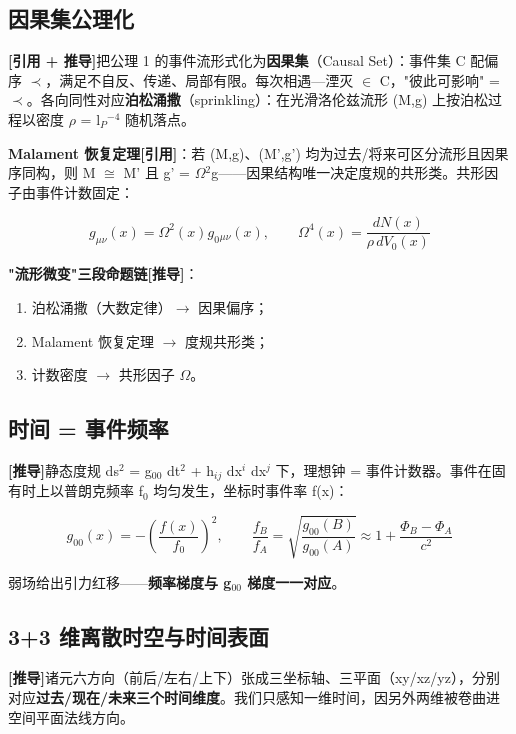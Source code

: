 \documentclass[UTF8,fontset=windows]{csoarticle}
\newcommand{\mtag}[1]{\textbf{[#1]}}
\newcommand{\up}[1]{\ensuremath{^{#1}}}
\newcommand{\down}[1]{\ensuremath{_{#1}}}
\begin{document}
\subsection{因果集公理化}

\mtag{引用 + 推导}把公理 1 的事件流形式化为\textbf{因果集}（Causal Set）：事件集 C 配偏序 \ensuremath{\prec}，满足不自反、传递、局部有限。每次相遇---湮灭 \ensuremath{\in} C，"彼此可影响" = \ensuremath{\prec}。各向同性对应\textbf{泊松涌撒}（sprinkling）：在光滑洛伦兹流形 (M,g) 上按泊松过程以密度 \ensuremath{\rho} = l\down{P}\up{-4} 随机落点。

\textbf{Malament 恢复定理}\mtag{引用}：若 (M,g)、(M',g') 均为过去/将来可区分流形且因果序同构，则 M \ensuremath{\cong} M' 且 g' = \ensuremath{\Omega}\up{2}g------因果结构唯一决定度规的共形类。共形因子由事件计数固定：

\[g_{\mu\nu}(x) = \Omega^2(x)g_0{}_{\mu\nu}(x),\qquad \Omega^4(x) = \frac{dN(x)}{\rho\,dV_0(x)}\]

\textbf{"流形微变"三段命题链}\mtag{推导}：
\begin{enumerate}
\item 泊松涌撒（大数定律）\ensuremath{\to} 因果偏序；
\item Malament 恢复定理 \ensuremath{\to} 度规共形类；
\item 计数密度 \ensuremath{\to} 共形因子 \ensuremath{\Omega}。
\end{enumerate}

\subsection{时间 = 事件频率}

\mtag{推导}静态度规 ds\up{2} = g\down{00} dt\up{2} + h\down{ij} dx\up{i} dx\up{j} 下，理想钟 = 事件计数器。事件在固有时上以普朗克频率 f\down{0} 均匀发生，坐标时事件率 f(x)：

\[g_{00}(x) = -\left(\frac{f(x)}{f_0}\right)^2,\qquad \frac{f_B}{f_A} = \sqrt{\frac{g_{00}(B)}{g_{00}(A)}} \approx 1 + \frac{\Phi_B - \Phi_A}{c^2}\]

弱场给出引力红移------\textbf{频率梯度与 g\down{00} 梯度一一对应}。

\subsection{3+3 维离散时空与时间表面}

\mtag{推导}诸元六方向（前后/左右/上下）张成三坐标轴、三平面（xy/xz/yz），分别对应\textbf{过去/现在/未来三个时间维度}。我们只感知一维时间，因另外两维被卷曲进空间平面法线方向。
\end{document}
